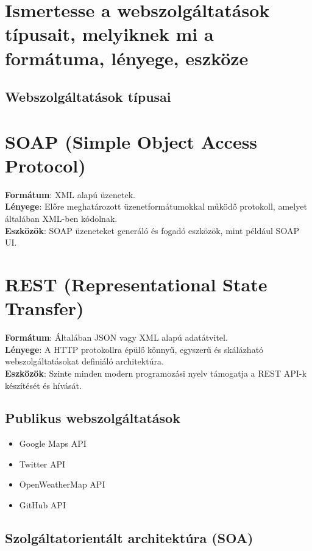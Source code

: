 \documentclass{report}
\begin{document}
		\section{Ismertesse a webszolgáltatások típusait, melyiknek mi a formátuma, lényege, eszköze}
			\subsection{Webszolgáltatások típusai}
				
				\section*{SOAP (Simple Object Access Protocol)}
					\textbf{Formátum}: XML alapú üzenetek.\\
					\textbf{Lényege}: Előre meghatározott üzenetformátumokkal működő protokoll, amelyet általában XML-ben kódolnak. \\
					\textbf{Eszközök}: SOAP üzeneteket generáló és fogadó eszközök, mint például SOAP UI.
				
				\section*{REST (Representational State Transfer)}
					\textbf{Formátum}: Általában JSON vagy XML alapú adatátvitel.\\
					\textbf{Lényege}: A HTTP protokollra épülő könnyű, egyszerű és skálázható webszolgáltatásokat definiáló architektúra. \\
					\textbf{Eszközök}: Szinte minden modern programozási nyelv támogatja a REST API-k készítését és hívását.
				
			\subsection{Publikus webszolgáltatások}
				\begin{itemize}
				    \item Google Maps API
				    \item Twitter API
				    \item OpenWeatherMap API
				    \item GitHub API
				\end{itemize}
			
			\subsection{Szolgáltatorientált architektúra (SOA)}
\end{document}
